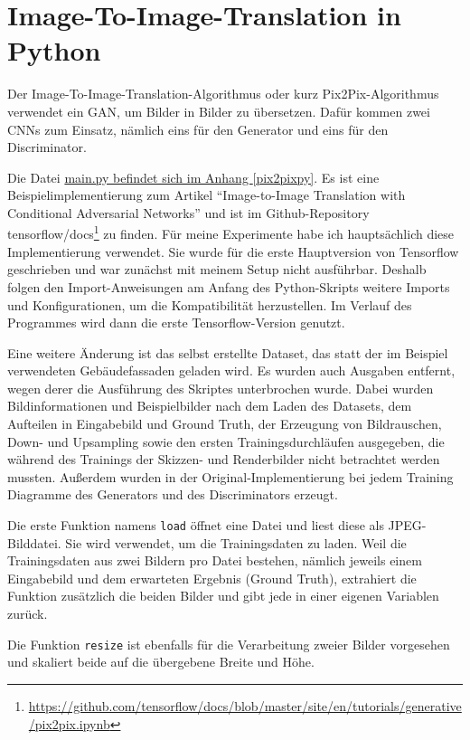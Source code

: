 \section{Image-To-Image-Translation in Python}
\label{sec:pix2pix}
Der Image-To-Image-Translation-Algorithmus oder kurz Pix2Pix-Algorithmus verwendet ein GAN, um Bilder in Bilder zu übersetzen. Dafür kommen zwei CNNs zum Einsatz, nämlich eins für den Generator und eins für den Discriminator. \cite{isola2018imagetoimage}

Die Datei \hyperref[pix2pixpy]{main.py befindet sich im Anhang \ref{pix2pixpy}}. Es ist eine Beispielimplementierung zum Artikel ``Image-to-Image Translation with Conditional Adversarial Networks'' \cite{isola2018imagetoimage} und ist im Github-Repository tensorflow/docs\footnote{\href{https://github.com/tensorflow/docs/blob/master/site/en/tutorials/generative/pix2pix.ipynb}{https://github.com/tensorflow/docs/blob/master/site/en/tutorials/generative/pix2pix.ipynb}} zu finden. Für meine Experimente habe ich hauptsächlich diese Implementierung verwendet. Sie wurde für die erste Hauptversion von Tensorflow geschrieben und war zunächst mit meinem Setup nicht ausführbar. Deshalb folgen den Import-Anweisungen am Anfang des Python-Skripts weitere Imports und Konfigurationen, um die Kompatibilität herzustellen. Im Verlauf des Programmes wird dann die erste Tensorflow-Version genutzt.

Eine weitere Änderung ist das selbst erstellte Dataset, das statt der im Beispiel verwendeten Gebäudefassaden geladen wird. Es wurden auch Ausgaben entfernt, wegen derer die Ausführung des Skriptes unterbrochen wurde. Dabei wurden Bildinformationen und Beispielbilder nach dem Laden des Datasets, dem Aufteilen in Eingabebild und Ground Truth, der Erzeugung von Bildrauschen, Down- und Upsampling sowie den ersten Trainingsdurchläufen ausgegeben, die während des Trainings der Skizzen- und Renderbilder nicht betrachtet werden mussten. Außerdem wurden in der Original-Implementierung bei jedem Training Diagramme des Generators und des Discriminators erzeugt.

Die erste Funktion namens \lstinline|load| öffnet eine Datei und liest diese als JPEG-Bilddatei. Sie wird verwendet, um die Trainingsdaten zu laden. Weil die Trainingsdaten aus zwei Bildern pro Datei bestehen, nämlich jeweils einem Eingabebild und dem erwarteten Ergebnis (Ground Truth), extrahiert die Funktion zusätzlich die beiden Bilder und gibt jede in einer eigenen Variablen zurück.

Die Funktion \lstinline|resize| ist ebenfalls für die Verarbeitung zweier Bilder vorgesehen und skaliert beide auf die übergebene Breite und Höhe.

